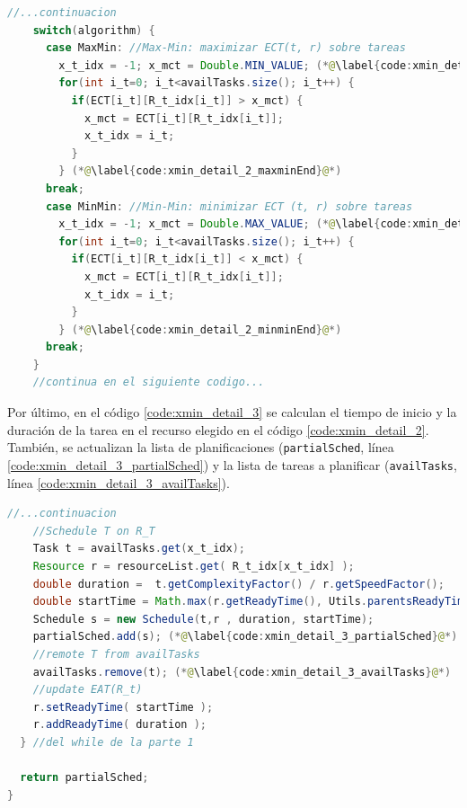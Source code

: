 \begin{lstlisting}[language=java,label={code:xmin_detail_2},caption={Método de MaxMin/MinMin que planifica las tareas (parte 2)},float]
    //...continuacion
    switch(algorithm) {
      case MaxMin: //Max-Min: maximizar ECT(t, r) sobre tareas
        x_t_idx = -1; x_mct = Double.MIN_VALUE; (*@\label{code:xmin_detail_2_maxminIni}@*)
        for(int i_t=0; i_t<availTasks.size(); i_t++) {
          if(ECT[i_t][R_t_idx[i_t]] > x_mct) {
            x_mct = ECT[i_t][R_t_idx[i_t]];
            x_t_idx = i_t;
          }
        } (*@\label{code:xmin_detail_2_maxminEnd}@*)
      break;
      case MinMin: //Min-Min: minimizar ECT (t, r) sobre tareas
        x_t_idx = -1; x_mct = Double.MAX_VALUE; (*@\label{code:xmin_detail_2_minminIni}@*)
        for(int i_t=0; i_t<availTasks.size(); i_t++) {
          if(ECT[i_t][R_t_idx[i_t]] < x_mct) {
            x_mct = ECT[i_t][R_t_idx[i_t]];
            x_t_idx = i_t;
          }
        } (*@\label{code:xmin_detail_2_minminEnd}@*)
      break;
    }
    //continua en el siguiente codigo...
\end{lstlisting}

Por último, en el código \ref{code:xmin_detail_3} se calculan el tiempo de inicio y la duración de la tarea en el recurso elegido en el código \ref{code:xmin_detail_2}. También, se actualizan la lista de planificaciones (\texttt{partialSched}, línea \ref{code:xmin_detail_3_partialSched}) y la lista de tareas a planificar (\texttt{availTasks}, línea \ref{code:xmin_detail_3_availTasks}).

\begin{lstlisting}[language=java,label={code:xmin_detail_3},caption={Método de MaxMin/MinMin que planifica las tareas (parte 3)},float]
    //...continuacion
    //Schedule T on R_T
    Task t = availTasks.get(x_t_idx);
    Resource r = resourceList.get( R_t_idx[x_t_idx] );
    double duration =  t.getComplexityFactor() / r.getSpeedFactor();
    double startTime = Math.max(r.getReadyTime(), Utils.parentsReadyTime(t, partialSched, w));
    Schedule s = new Schedule(t,r , duration, startTime);
    partialSched.add(s); (*@\label{code:xmin_detail_3_partialSched}@*)
    //remote T from availTasks
    availTasks.remove(t); (*@\label{code:xmin_detail_3_availTasks}@*)
    //update EAT(R_t)
    r.setReadyTime( startTime );
    r.addReadyTime( duration );
  } //del while de la parte 1

  return partialSched;
}
\end{lstlisting}
